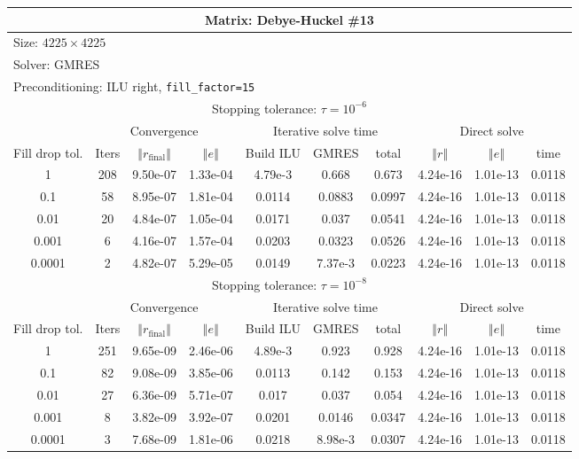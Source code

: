 \documentclass[oneside,final]{amsart}  %
\begin{document}
\begin{tabular}{|c|c|c|c|c|c|c|c|c|c|}
\hline
\multicolumn{10}{|c|}{Matrix: Debye-Huckel \#13}\tabularnewline
\hline
  \multicolumn{10}{|l|}{Size: $4225\times4225$}\tabularnewline
\hline
\multicolumn{10}{|l|}{Solver: GMRES}\tabularnewline
\hline
\multicolumn{10}{|l|}{Preconditioning: ILU right, \texttt{fill\_factor=15}}\tabularnewline
\hline
\hline
\multicolumn{10}{|c|}{Stopping tolerance: $\tau=10^{-6}$}\tabularnewline
\hline
\hline
 & \multicolumn{3}{c|}{Convergence} & \multicolumn{3}{c|}{Iterative solve time} & \multicolumn{3}{c|}{Direct solve}\tabularnewline
\hline
Fill drop tol.  & Iters & $\left\Vert r_{\text{final}}\right\Vert $  & $\left\Vert e\right\Vert $  & Build ILU  & GMRES  & total  & $\left\Vert r\right\Vert $ & $\left\Vert e\right\Vert $  & time\tabularnewline
\hline
1      & 208 & 9.50e-07 & 1.33e-04 & 4.79e-3 &   0.668 &   0.673 & 4.24e-16 & 1.01e-13 &    0.0118\\
  \hline
0.1    & 58  & 8.95e-07 & 1.81e-04 &  0.0114 &  0.0883 &  0.0997 & 4.24e-16 & 1.01e-13 &    0.0118\\
  \hline
0.01   & 20  & 4.84e-07 & 1.05e-04 &  0.0171 &   0.037 &  0.0541 & 4.24e-16 & 1.01e-13 &    0.0118\\
  \hline
0.001  & 6   & 4.16e-07 & 1.57e-04 &  0.0203 &  0.0323 &  0.0526 & 4.24e-16 & 1.01e-13 &    0.0118\\
  \hline
0.0001 & 2   & 4.82e-07 & 5.29e-05 &  0.0149 & 7.37e-3 &  0.0223 & 4.24e-16 & 1.01e-13 &    0.0118\\
  \hline
\hline
\multicolumn{10}{|c|}{Stopping tolerance: $\tau=10^{-8}$}\tabularnewline
\hline
\hline
 & \multicolumn{3}{c|}{Convergence} & \multicolumn{3}{c|}{Iterative solve time} & \multicolumn{3}{c|}{Direct solve }\tabularnewline
\hline
Fill drop tol.  & Iters  & $\left\Vert r_{\text{final}}\right\Vert $  & $\left\Vert e\right\Vert $ & Build ILU  & GMRES  & total  & $\left\Vert r\right\Vert $  & $\left\Vert e\right\Vert $  & time\tabularnewline
\hline
1      & 251 & 9.65e-09 & 2.46e-06 & 4.89e-3 &   0.923 &   0.928 & 4.24e-16 & 1.01e-13 &    0.0118\\
  \hline
0.1    & 82  & 9.08e-09 & 3.85e-06 &  0.0113 &   0.142 &   0.153 & 4.24e-16 & 1.01e-13 &    0.0118\\
  \hline
0.01   & 27  & 6.36e-09 & 5.71e-07 &   0.017 &   0.037 &   0.054 & 4.24e-16 & 1.01e-13 &    0.0118\\
  \hline
0.001  & 8   & 3.82e-09 & 3.92e-07 &  0.0201 &  0.0146 &  0.0347 & 4.24e-16 & 1.01e-13 &    0.0118\\
  \hline
0.0001 & 3   & 7.68e-09 & 1.81e-06 &  0.0218 & 8.98e-3 &  0.0307 & 4.24e-16 & 1.01e-13 &    0.0118\\
  \hline
\end{tabular}
\end{document}
